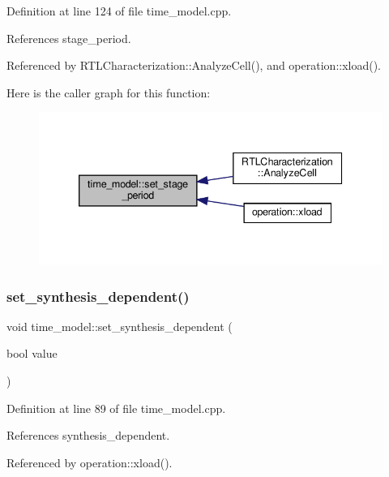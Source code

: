 Definition at line 124 of file time\+\_\+model.\+cpp.



References stage\+\_\+period.



Referenced by R\+T\+L\+Characterization\+::\+Analyze\+Cell(), and operation\+::xload().

Here is the caller graph for this function\+:
\nopagebreak
\begin{figure}[H]
\begin{center}
\leavevmode
\includegraphics[width=339pt]{d3/d73/classtime__model_a77760cc70901f92295314797e5a50ba1_icgraph}
\end{center}
\end{figure}
\mbox{\label{classtime__model_a481cdb29f6fd68bc79d6d25adf916c9a}} 
\subsubsection{\texorpdfstring{set\+\_\+synthesis\+\_\+dependent()}{set\_synthesis\_dependent()}}
{\footnotesize\ttfamily void time\+\_\+model\+::set\+\_\+synthesis\+\_\+dependent (\begin{DoxyParamCaption}\item[{bool}]{value }\end{DoxyParamCaption})}



Definition at line 89 of file time\+\_\+model.\+cpp.



References synthesis\+\_\+dependent.



Referenced by operation\+::xload().

